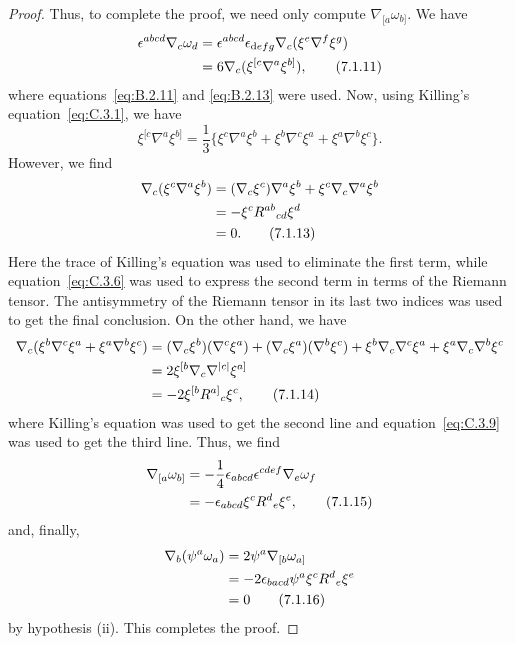 \begin{proof}
Thus, to complete the proof, we need only compute \(\nabla_{[a}\omega_{b]}\). We
have
\begin{align}
  \epsilon^{abcd}\nabla_c\omega_d
    &=\epsilon^{abcd}\epsilon_{\mathop{}\!\mathrm{d} efg}\nabla_c(\xi^e\nabla^f\xi^g)\notag\\
    &=6\nabla_c(\xi^{[c}\nabla^a\xi^{b]}) ,
  \tag{7.1.11}\label{eq:7.1.11}
\end{align}
where equations~\eqref{eq:B.2.11} and \eqref{eq:B.2.13} were used. Now, using
Killing's equation~\eqref{eq:C.3.1}, we have
\begin{equation}
  \xi^{[c}\nabla^a\xi^{b]}=\frac13
  \{\xi^c\nabla^a\xi^b+\xi^b\nabla^c\xi^a+\xi^a\nabla^b\xi^c\} .
  \tag{7.1.12}\label{eq:7.1.12}
\end{equation}
However, we find
\begin{align}
  \nabla_c(\xi^c\nabla^a\xi^b)
    &=(\nabla_c\xi^c)\nabla^a\xi^b+\xi^c\nabla_c\nabla^a\xi^b\notag\\
    &=-\xi^cR^{ab}{}_{cd}\xi^d\notag\\
    &=0 .
  \tag{7.1.13}\label{eq:7.1.13}
\end{align}
Here the trace of Killing's equation was used to eliminate the first term, while
equation~\eqref{eq:C.3.6} was used to express the second term in terms of the
Riemann tensor. The antisymmetry of the Riemann tensor in its last two indices was
used to get the final conclusion. On the other hand, we have
\begin{align}
  \nabla_c(\xi^b\nabla^c\xi^a+\xi^a\nabla^b\xi^c)
    &=(\nabla_c\xi^b)(\nabla^c\xi^a)
      +(\nabla_c\xi^a)(\nabla^b\xi^c)
      +\xi^b\nabla_c\nabla^c\xi^a
      +\xi^a\nabla_c\nabla^b\xi^c\notag\\
    &=2\xi^{[b}\nabla_c\nabla^{|c|}\xi^{a]}\notag\\
    &=-2\xi^{[b}R^{a]}{}_c\xi^c ,
  \tag{7.1.14}\label{eq:7.1.14}
\end{align}
where Killing's equation was used to get the second line and
equation~\eqref{eq:C.3.9} was used to get the third line. Thus, we find
\begin{align}
  \nabla_{[a}\omega_{b]}
    &=-\frac14\epsilon_{abcd}\epsilon^{cdef}\nabla_e\omega_f\notag\\
    &=-\epsilon_{abcd}\xi^cR^d{}_e\xi^e ,
  \tag{7.1.15}\label{eq:7.1.15}
\end{align}
and, finally,
\begin{align}
  \nabla_b(\psi^a\omega_a)
    &=2\psi^a\nabla_{[b}\omega_{a]}\notag\\
    &=-2\epsilon_{bacd}\psi^a\xi^cR^d{}_e\xi^e\notag\\
    &=0
  \tag{7.1.16}\label{eq:7.1.16}
\end{align}
by hypothesis (ii). This completes the proof.
\end{proof}

